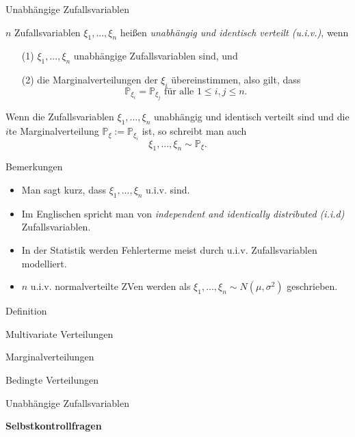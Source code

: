 \documentclass[
  8pt,
  ignorenonframetext,
]{beamer}
\providecommand{\tightlist}{%
  \setlength{\itemsep}{0pt}\setlength{\parskip}{0pt}}
\begin{document}
\begin{frame}{Unabhängige Zufallsvariablen}
\protect\hypertarget{unabhuxe4ngige-zufallsvariablen-5}{}
\small
\begin{definition}
\justifying
$n$ Zufallsvariablen $\xi_1,...,\xi_n$ heißen \textit{unabhängig und identisch verteilt (u.i.v.)}, wenn
\begin{itemize}
\item[(1)] $\xi_1,...,\xi_n$ unabhängige Zufallsvariablen sind, und
\item[(2)] die Marginalverteilungen der $\xi_i$ übereinstimmen, also gilt, dass
\begin{equation}
\mathbb{P}_{\xi_i} = \mathbb{P}_{\xi_j} \mbox{ für alle } 1 \le i,j \le n.
\end{equation}
\end{itemize}
Wenn die Zufallsvariablen $\xi_1,...,\xi_n$ unabhängig und identisch verteilt sind
und die $i$te Marginalverteilung $\mathbb{P}_\xi := \mathbb{P}_{\xi_i}$ ist, so 
schreibt man auch
\begin{equation}
\xi_1,...,\xi_n \sim \mathbb{P}_\xi.
\end{equation}
\end{definition}

Bemerkungen

\begin{itemize}
\tightlist
\item
  Man sagt kurz, dass \(\xi_1,...,\xi_n\) u.i.v. sind.
\item
  Im Englischen spricht man von
  \textit{independent and identically distributed (i.i.d)}
  Zufallsvariablen.
\item
  In der Statistik werden Fehlerterme meist durch u.i.v.
  Zufallsvariablen modelliert.
\item
  \(n\) u.i.v. normalverteilte ZVen werden als
  \(\xi_1,...,\xi_n \sim N(\mu,\sigma^2)\) geschrieben.
\end{itemize}
\end{frame}

\begin{frame}{}
\protect\hypertarget{section-10}{}
\large
{}
\vfill

Definition

Multivariate Verteilungen

Marginalverteilungen

Bedingte Verteilungen

Unabhängige Zufallsvariablen

\textbf{Selbstkontrollfragen}

\vfill
\end{frame}
\end{document}
